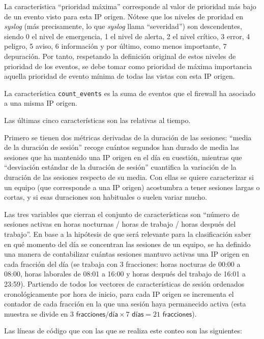 La característica ``prioridad máxima'' corresponde al valor de prioridad más bajo de un evento visto para esta IP origen.
Nótese que los niveles de proridad en \emph{syslog} (más precisamente, lo que \emph{syslog} llama ``severidad'') son descendentes,
siendo 0 el nivel de emergencia, 1 el nivel de alerta, 2 el nivel crítico, 3 error, 4 peligro, 5 aviso, 6 información y por último, como menos importante, 7 depuración.
Por tanto, respetando la definición original de estos niveles de prioridad de los eventos,
se debe tomar como prioridad de máxima importancia aquella prioridad de evento mínima de todas las vistas con esta IP origen.

La característica \texttt{count\_events} es la suma de eventos que el firewall ha asociado a una misma IP origen.

Las últimas cinco características son las relativas al tiempo.

Primero se tienen dos métricas derivadas de la duración de las sesiones:
``media de la duración de sesión'' recoge cuántos segundos han durado de media las sesiones que ha mantenido una IP origen en el día en cuestión,
mientras que ``desviación estándar de la duración de sesión'' cuantifica la variación de la duración de las sesiones respecto de su media.
Con ellas se quiere caracterizar si un equipo (que corresponde a una IP origen) acostumbra a tener sesiones largas o cortas,
y si esas duraciones son habituales o suelen variar mucho.

Las tres variables que cierran el conjunto de características son ``número de sesiones activas en horas nocturnas / horas de trabajo / horas después del trabajo''.
En base a la hipótesis de que será relevante para la clasificación saber en qué momento del día se concentran las sesiones de un equipo,
se ha definido una manera de contabilizar cuántas sesiones mantuvo activas una IP origen en cada fracción del día
(se trabaja con 3 fracciones: horas nocturas de 00:00 a 08:00, horas laborales de 08:01 a 16:00 y horas después del trabajo de 16:01 a 23:59).
Partiendo de todos los vectores de características de sesión ordenados cronológicamente por hora de inicio,
para cada IP origen se incrementa el contador de cada fracción en la que una sesión haya permanecido activa
(esta muestra se divide en $3\textsf{ fracciones/día} \times 7\textsf{ días} = 21\textsf{ fracciones}$).

Las líneas de código que con las que se realiza este conteo son las siguientes:

